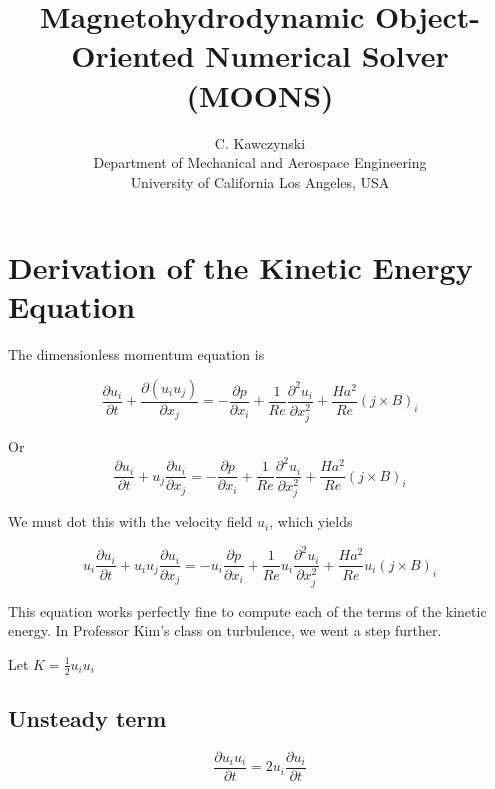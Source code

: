 \documentclass[11pt]{article}
\begin{document}
\doublespacing
\title{Magnetohydrodynamic Object-Oriented Numerical Solver (MOONS)}
\author{C. Kawczynski \\
Department of Mechanical and Aerospace Engineering \\
University of California Los Angeles, USA\\
}
\maketitle

\section{Derivation of the Kinetic Energy Equation}
The dimensionless momentum equation is

\begin{equation}
	\frac{\partial u_i}{\partial t} + 
	\frac{\partial (u_i u_j)}{\partial x_j}
	= 
	- \frac{\partial p}{\partial x_i}
	+ \frac{1}{Re}
	\frac{\partial^2 u_i}{\partial x_j^2}
	+ \frac{Ha^2}{Re}
	(j \times B)_i
\end{equation}

Or
\begin{equation}
	\frac{\partial u_i}{\partial t} + 
	u_j\frac{\partial u_i}{\partial x_j}
	= 
	- \frac{\partial p}{\partial x_i}
	+ \frac{1}{Re}
	\frac{\partial^2 u_i}{\partial x_j^2}
	+ \frac{Ha^2}{Re}
	(j \times B)_i
\end{equation}


We must dot this with the velocity field $u_i$, which yields

\begin{equation}
	\boxed{
	u_i
	\frac{\partial u_i}{\partial t} + 
	u_i
	u_j\frac{\partial u_i}{\partial x_j}
	= 
	- u_i
	\frac{\partial p}{\partial x_i}
	+ \frac{1}{Re}
	u_i
	\frac{\partial^2 u_i}{\partial x_j^2}
	+ \frac{Ha^2}{Re}
	u_i
	(j \times B)_i
	}
\end{equation}

This equation works perfectly fine to compute each of the terms of the kinetic energy. In Professor Kim's class on turbulence, we went a step further.

Let $K = \frac{1}{2} u_i u_i$

\subsection{Unsteady term}
\begin{equation}
	\frac{\partial u_i u_i}{\partial t}
	=
	2 u_i \frac{\partial u_i}{\partial t}
\end{equation}
\end{document}
